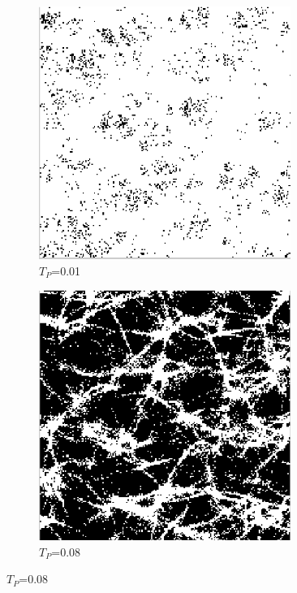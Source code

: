\begin{figure}[H]
\begin{minipage}{0.5\textwidth}
  \centering
  \\
  \begin{subfigure}{0.5\textwidth}
    \centering
    \includegraphics[width=0.9\textwidth]{Figures/chapter-image/binary/fig_bin_01.png}
    \caption{$T_P$=0.01}
  \end{subfigure}%
  \begin{subfigure}{0.5\textwidth}
    \centering
    \includegraphics[width=0.9\textwidth]{Figures/chapter-image/binary/fig_bin_08.png}
    \caption{$T_P$=0.08}
  \end{subfigure}


\end{minipage}
\end{figure}
